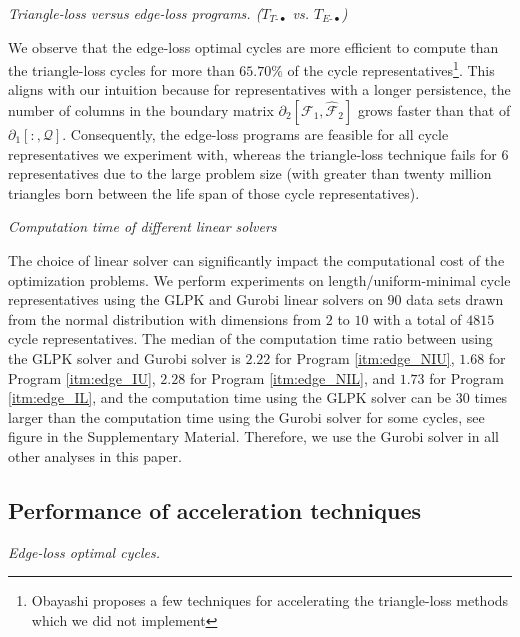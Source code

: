 \documentclass[utf8]{formatting_stuff/frontiersFPHY}
\newcommand{\pr}{Program }
\theoremstyle{plain}
\theoremstyle{definition}
\begin{document}
\emph{Triangle-loss versus edge-loss programs. ($T_{T\text{-}\bullet}$ vs. $T_{E\text{-}\bullet}$)} 
 

We observe that the edge-loss optimal cycles are more efficient to compute than the triangle-loss cycles for more than $65.70\%$ of the cycle representatives\footnote{Obayashi \cite{Obayashi2018} proposes a few techniques for accelerating the triangle-loss methods which we did not implement}. This aligns with our intuition because for representatives with a longer persistence, the number of columns in the boundary matrix $\partial_{2}[ \mathcal{F}_1 , \hat {\mathcal{F}}_{2} ]$ grows faster than that of $\partial_1[:, \mathcal{Q}]$. Consequently, the edge-loss programs are feasible for all cycle representatives we experiment with, whereas the triangle-loss technique fails for $6$ representatives due to the large problem size (with greater than twenty million triangles born between the life span of those cycle representatives).

\emph{Computation time of different linear solvers}

The choice of linear solver can significantly impact the computational cost of the optimization problems. We perform experiments on length/uniform-minimal cycle representatives using the GLPK \cite{glpk} and Gurobi \cite{gurobi} linear solvers on $90$ data sets drawn from the normal distribution with dimensions from $2$ to $10$ with a total of $4815$ cycle representatives. The median of the computation time ratio between using the GLPK solver and Gurobi solver is $2.22$ for \pr
\ref{itm:edge_NIU}, $1.68$ for \pr \ref{itm:edge_IU}, $2.28$ for \pr \ref{itm:edge_NIL}, and $1.73$ for \pr \ref{itm:edge_IL}, and the computation time using the GLPK solver can be $30$ times larger than the computation time using the Gurobi solver for some cycles, see figure in the Supplementary Material. Therefore, we use the Gurobi solver in all other analyses in this paper. 



 

\subsection{Performance of acceleration techniques} \label{accelerateresults}

\emph{Edge-loss optimal cycles.} 
\end{document}
